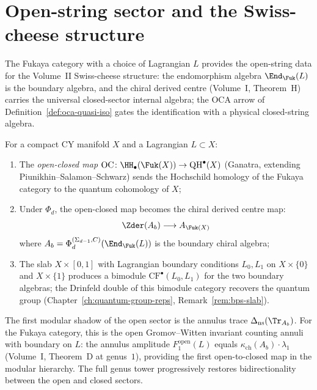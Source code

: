\section{Open-string sector and the Swiss-cheese structure}
\label{sec:fukaya-open-string}

The Fukaya category with a choice of Lagrangian $L$ provides the
open-string data for the Volume~II Swiss-cheese structure: the
endomorphism algebra $\End_{\Fuk}(L)$ is the boundary algebra,
and the chiral derived centre (Volume~I, Theorem~H) carries the
universal closed-sector internal algebra; the OCA arrow of
Definition~\ref{def:oca-quasi-iso} gates the identification with a
physical closed-string algebra.

\begin{proposition}
\label{prop:fukaya-open-closed}
For a compact CY manifold $X$ and a Lagrangian $L \subset X$:
\begin{enumerate}[label=(\roman*)]
 \item The \emph{open-closed map}
 $\mathrm{OC} \colon \HH_\bullet(\Fuk(X)) \to
 \mathrm{QH}^\bullet(X)$
 (Ganatra, extending Piunikhin--Salamon--Schwarz) sends the
 Hochschild homology of the Fukaya category to the quantum
 cohomology of $X$;
 \item Under $\Phi_d$, the open-closed map becomes the chiral derived
 centre map:
 \[
 \Zder(A_b) \longrightarrow A_{\Fuk(X)}
 \]
 where $A_b = \Phi_d^{(\Sigma_{d-1}, C)}(\End_{\Fuk}(L))$ is the
 boundary chiral algebra;
 \item The slab $X \times [0,1]$ with Lagrangian boundary conditions
 $L_0, L_1$ on $X \times \{0\}$ and $X \times \{1\}$ produces
 a bimodule $\mathrm{CF}^\bullet(L_0, L_1)$ for the two boundary
 algebras; the Drinfeld double of this bimodule category recovers
 the quantum group
 (Chapter~\ref{ch:quantum-group-reps},
 Remark~\ref{rem:bps-slab}).
\end{enumerate}
\end{proposition}

\begin{remark}
\label{rem:fukaya-annulus-trace}
The first modular shadow of the open sector is the annulus trace
$\Delta_{\mathrm{ns}}(\Tr_{A_b})$. For the Fukaya category, this
is the open Gromov--Witten invariant counting annuli with boundary
on $L$: the annulus amplitude $F_1^{\mathrm{open}}(L)$ equals
$\kappa_{\mathrm{ch}}(A_b) \cdot \lambda_1$ (Volume~I, Theorem~D at
genus~$1$), providing the first open-to-closed map in the modular
hierarchy. The full genus tower progressively restores
bidirectionality between the open and closed sectors.
\end{remark}

